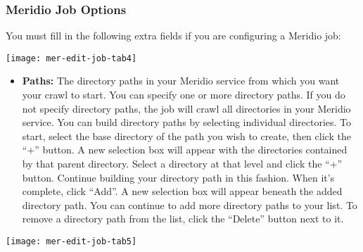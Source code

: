 %
%

\subsubsection{Meridio Job Options}

You must fill in the following extra fields if you are configuring a
Meridio job:




\texttt{[image: mer-edit-job-tab4]}

\begin{itemize}

\item \textbf{Paths:} The directory paths in your Meridio
service from which you want your crawl to start. You can specify
one or more directory paths. If you do not specify directory paths,
the job will crawl all directories in your Meridio service. You
can build directory paths by selecting individual directories. To
start, select the base directory of the path you wish to create, then
click the ``+'' button. A new selection box will appear with the
directories contained by that parent directory. Select a directory at
that level and click the ``+'' button. Continue building your
directory path in this fashion. When it's complete, click ``Add''. A
new selection box will appear beneath the added directory path. You
can continue to add more directory paths to your list. To remove a
directory path from the list, click the ``Delete'' button next to it.

\end{itemize}

\texttt{[image: mer-edit-job-tab5]}

